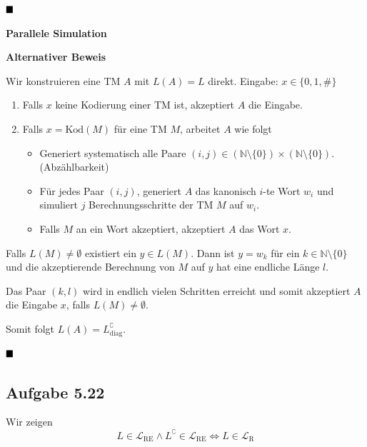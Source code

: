 \documentclass[a4paper, 11pt]{article}
\def\N{\mathbb{N}}
\def\Lre{\mathcal{L}_\text{RE}}
\def\Lr{\mathcal{L}_\text{R}}
\newcommand\myTitle[1]{{\large \textbf {#1}}}
\begin{document}
                    $\hfill\blacksquare$
                
                
                
                    \myTitle{Parallele Simulation}

                    \textbf{Alternativer Beweis}
                
                    Wir konstruieren eine TM $A$ mit $L(A) = L$ direkt.
                    Eingabe: $x \in \{0,1,\#\}$
                    \begin{enumerate}[label=\Roman*.]
                        
                        \item Falls $x$ keine Kodierung einer TM ist, akzeptiert $A$ die Eingabe.
                        
                        \item Falls $x = \text{Kod}(M)$ für eine TM $M$, arbeitet $A$ wie folgt
                        \begin{itemize}[label=-]
                            \item Generiert systematisch alle Paare $(i, j) \in (\N \setminus \{0\}) \times (\N \setminus \{0\})$. (Abzählbarkeit)
                            \item Für jedes Paar $(i, j)$, generiert $A$ das kanonisch $i$-te Wort $w_i$ und simuliert $j$ Berechnungsschritte der TM $M$ auf $w_i$.
                            \item Falls $M$ an ein Wort akzeptiert, akzeptiert $A$ das Wort $x$.
                        \end{itemize}
                    \end{enumerate}
                
                    Falls $L(M) \neq \emptyset$ existiert ein $y \in L(M)$. Dann ist $y = w_k$ für ein $k \in \N\setminus\{0\}$ und die akzeptierende Berechnung von $M$ auf $y$ hat eine endliche Länge $l$.
                
                    Das Paar $(k, l)$ wird in endlich vielen Schritten erreicht und somit akzeptiert $A$ die Eingabe $x$, falls $L(M) \neq \emptyset$.
                
                    Somit folgt $L(A) = L_{\text{diag}}^\complement$.
                
                    $\hfill\blacksquare$
                
                
                
                    \subsection{Aufgabe 5.22}
                    Wir zeigen
                    $$L \in \Lre \land L^\complement \in \Lre \iff L \in \Lr$$
                
\end{document}
